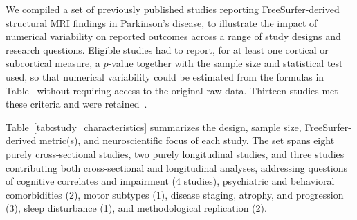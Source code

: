 We compiled a set of previously published studies reporting FreeSurfer-derived
structural MRI findings in Parkinson's disease, to illustrate the impact of
numerical variability on reported outcomes across a range of study designs and
research questions. Eligible studies had to report, for at least one cortical
or subcortical measure, a $p$-value together with the sample size and
statistical test used, so that numerical variability could be estimated from
the formulas in Table~ without requiring
access to the original raw data. Thirteen studies met these criteria and were
retained~\cite{chagas2017neuroimaging,garcia2014structural,gerrits2016cortical,
    hanganu2014mild,lewis2016pattern,li2022cortical,mak2014subcortical,
    pellicano2015morphometric,radziunas2018brain,sokolowski2024impact,
    sokolowski2024longitudinal,wilson2019cortical,yang2024longitudinal}.

Table~\ref{tab:study_characteristics} summarizes the design, sample size,
FreeSurfer-derived metric(s), and neuroscientific focus of each study. The set
spans eight purely cross-sectional studies, two purely longitudinal studies,
and three studies contributing both cross-sectional and longitudinal
analyses, addressing questions of cognitive correlates and impairment (4
studies), psychiatric and behavioral comorbidities (2), motor subtypes (1),
disease staging, atrophy, and progression (3), sleep disturbance (1), and
methodological replication (2).

